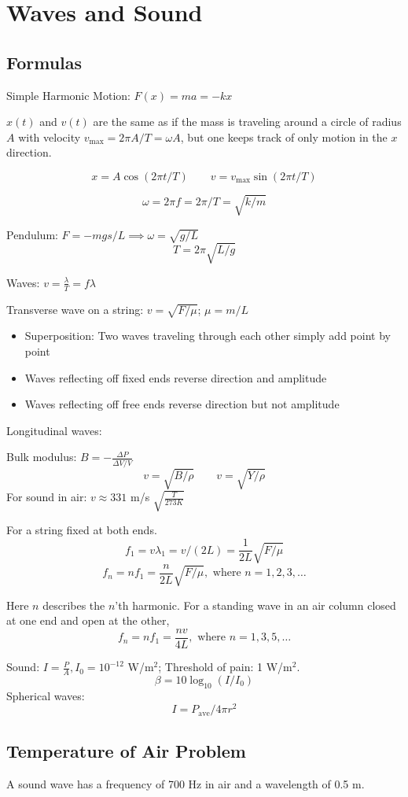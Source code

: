 \documentclass[../physics12.tex]{subfiles}
\begin{document}
\chapter{Waves and Sound}
\section{Formulas}
Simple Harmonic Motion: $F(x)=ma=-kx$

$x(t)$ and $v(t)$ are the same as if the mass is traveling around a circle of radius $A$ with velocity $v_{\text{max}}=2\pi A/T = \omega A$, but one keeps track of only motion in the $x$ direction.

\[x = A\cos(2\pi t/T) \qquad v=v_{\text{max}}\sin(2\pi t/T)\]

\[\omega = 2\pi f = 2\pi/T = \sqrt{k/m}\]

Pendulum: $F=-mgs/L \implies \omega = \sqrt{g/L}$
\[ T = 2\pi\sqrt{L/g} \]

Waves: $v=\frac{\lambda}{T}=f\lambda$

Transverse wave on a string: $v=\sqrt{F/\mu}$; $\mu = m/L$
\begin{itemize}
    \item Superposition: Two waves traveling through each other simply add point by point 
    \item Waves reflecting off fixed ends reverse direction and amplitude 
    \item Waves reflecting off free ends reverse direction but not amplitude 
\end{itemize}

Longitudinal waves:

Bulk modulus: $B = -\frac{\Delta P}{\Delta V/V}$
\[ v = \sqrt{B/\rho} \qquad v = \sqrt{Y/\rho} \]
For sound in air: $v\approx 331$ m/s $\sqrt{\frac{T}{273K}}$

For a string fixed at both ends.
\[ f_1 = v\lambda_1 = v/(2L)=\frac{1}{2L}\sqrt{F/\mu} \]
\[ f_n = nf_1 = \frac{n}{2L}\sqrt{F/\mu}, \text{ where } n = 1,2,3,\dots\]

Here $n$ describes the $n$'th harmonic. For a standing wave in an air column closed at one end and open at the other, 
\[ f_n = nf_1 = \frac{nv}{4L}, \text{ where } n = 1,3,5,\dots \]

Sound: $I=\frac{P}{A}, I_0 = 10^{-12}$ W/m$^2$; Threshold of pain: 1 W/m$^2$.
\[ \beta = 10\log_{10}(I/I_0) \]
Spherical waves:
\[ I = P_{\text{ave}}/4\pi r^2 \]

\section{Temperature of Air Problem}
A sound wave has a frequency of 700 Hz in air and a wavelength of 0.5 m.
\end{document}
